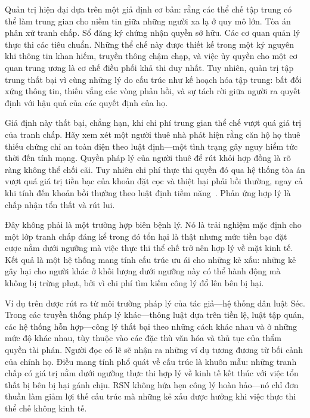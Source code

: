 \documentclass[11pt,a4paper,twocolumn]{article}
\begin{document}
Quản trị hiện đại dựa trên một giả định cơ bản: rằng các thể chế tập trung có thể làm trung gian cho niềm tin giữa những người xa lạ ở quy mô lớn. Tòa án phân xử tranh chấp. Sổ đăng ký chứng nhận quyền sở hữu. Các cơ quan quản lý thực thi các tiêu chuẩn. Những thể chế này được thiết kế trong một kỷ nguyên khi thông tin khan hiếm, truyền thông chậm chạp, và việc ủy quyền cho một cơ quan trung ương là cơ chế điều phối khả thi duy nhất. Tuy nhiên, quản trị tập trung thất bại vì cùng những lý do cấu trúc như kế hoạch hóa tập trung: bất đối xứng thông tin, thiếu vắng các vòng phản hồi, và sự tách rời giữa người ra quyết định với hậu quả của các quyết định của họ.

Giả định này thất bại, chẳng hạn, khi chi phí trung gian thể chế vượt quá giá trị của tranh chấp. Hãy xem xét một người thuê nhà phát hiện rằng căn hộ họ thuê thiếu chứng chỉ an toàn điện theo luật định---một tình trạng gây nguy hiểm tức thời đến tính mạng. Quyền pháp lý của người thuê để rút khỏi hợp đồng là rõ ràng không thể chối cãi. Tuy nhiên chi phí thực thi quyền đó qua hệ thống tòa án vượt quá giá trị tiền bạc của khoản đặt cọc và thiệt hại phải bồi thường, ngay cả khi tính đến khoản bồi thường theo luật định tiềm năng~\cite{czcourtfees}. Phản ứng hợp lý là chấp nhận tổn thất và rút lui.

Đây không phải là một trường hợp biên bệnh lý. Nó là trải nghiệm mặc định cho một lớp tranh chấp đáng kể trong đó tổn hại là thật nhưng mức tiền bạc đặt cược nằm dưới ngưỡng mà việc thực thi thể chế trở nên hợp lý về mặt kinh tế. Kết quả là một hệ thống mang tính cấu trúc ưu ái cho những kẻ xấu: những kẻ gây hại cho người khác ở khối lượng dưới ngưỡng này có thể hành động mà không bị trừng phạt, bởi vì chi phí tìm kiếm công lý đổ lên bên bị hại.

Ví dụ trên được rút ra từ môi trường pháp lý của tác giả---hệ thống dân luật Séc. Trong các truyền thống pháp lý khác---thông luật dựa trên tiền lệ, luật tập quán, các hệ thống hỗn hợp---công lý thất bại theo những cách khác nhau và ở những mức độ khác nhau, tùy thuộc vào các đặc thù văn hóa và thủ tục của thẩm quyền tài phán. Người đọc có lẽ sẽ nhận ra những ví dụ tương đương từ bối cảnh của chính họ. Điều mang tính phổ quát về cấu trúc là khuôn mẫu: những tranh chấp có giá trị nằm dưới ngưỡng thực thi hợp lý về kinh tế kết thúc với việc tổn thất bị bên bị hại gánh chịu. RSN không hứa hẹn công lý hoàn hảo---nó chỉ đơn thuần làm giảm lợi thế cấu trúc mà những kẻ xấu được hưởng khi việc thực thi thể chế không kinh tế.
\end{document}
